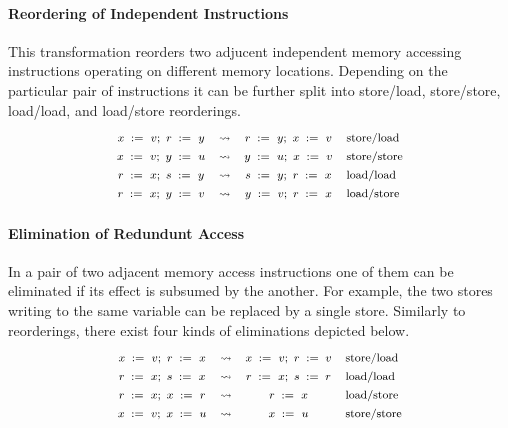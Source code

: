 \paragraph{Reordering of Independent Instructions} 

This transformation reorders two 
adjucent independent memory accessing instructions
operating on different memory locations.
Depending on the particular pair of instructions
it can be further split into store/load, store/store, 
load/load, and load/store reorderings.  
%
\[\def\arraystretch{1.4}\footnotesize
  \begin{array}{cccl} 

      \writeInst{}{x}{v} \seq \readInst{}{r}{y} 
    & \leadsto 
    & \readInst{}{r}{y} \seq \writeInst{}{x}{v}
    & \text{store/load}  \\ 

      \writeInst{}{x}{v} \seq \writeInst{}{y}{u} 
    & \leadsto 
    & \writeInst{}{y}{u} \seq \writeInst{}{x}{v}
    & \text{store/store}  \\ 

      \readInst{}{r}{x} \seq \readInst{}{s}{y} 
    & \leadsto 
    & \readInst{}{s}{y} \seq \readInst{}{r}{x}
    & \text{load/load}  \\ 

      \readInst{}{r}{x} \seq \writeInst{}{y}{v} 
    & \leadsto 
    & \writeInst{}{y}{v} \seq \readInst{}{r}{x}
    & \text{load/store}  \\ 

  \end{array}
\]

\paragraph{Elimination of Redundunt Access} 

In a pair of two adjacent memory access instructions 
one of them can be eliminated if its effect 
is subsumed by the another. 
For example, the two stores writing to the same variable 
can be replaced by a single store.  
Similarly to reorderings, there exist four kinds 
of eliminations depicted below. 
%
\[\def\arraystretch{1.4}\footnotesize
  \begin{array}{cccl} 

      \writeInst{}{x}{v} \seq \readInst{}{r}{x} 
    & \leadsto 
    & \writeInst{}{x}{v} \seq \assignInst{r}{v}
    & \text{store/load}  \\ 

      \readInst{}{r}{x} \seq \readInst{}{s}{x} 
    & \leadsto 
    & \readInst{}{r}{x} \seq \assignInst{s}{r}
    & \text{load/load}  \\ 

      \readInst{}{r}{x} \seq \writeInst{}{x}{r} 
    & \leadsto 
    & \readInst{}{r}{x} 
    & \text{load/store}  \\ 

      \writeInst{}{x}{v} \seq \writeInst{}{x}{u} 
    & \leadsto 
    & \writeInst{}{x}{u}
    & \text{store/store}  \\ 

  \end{array}
\]


